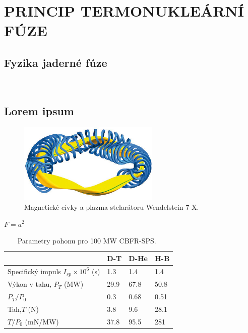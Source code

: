 \documentclass[main.tex]{subfiles}
\begin{document}
\section{PRINCIP TERMONUKLEÁRNÍ FÚZE}
\subsection{Fyzika jaderné fúze}

\lipsum[3]~\cite{hejzlar}

\lipsum[2-4]
\subsection{Lorem ipsum}
\lipsum[1]

\begin{figure}[]
    \centering
    \includegraphics[width=0.6\textwidth]{obrazky/stelarator.jpg}
    \caption{Magnetické cívky a plazma stelarátoru Wendelstein 7-X.\cite{wx-7}}
    \label{fig:wx-7}
\end{figure}
\lipsum[1]
\(F=a^2\)
\begin{table}[]
    \centering
    \caption{Parametry pohonu pro 100 MW CBFR-SPS.~\cite{cheung2004colliding}}
    \begin{tabular}{  p{19em}  p{3em}  p{3em}  p{3em}  }
                                               & D-T  & D-He & H-B \\ \toprule
    Specifický impuls \(I_{sp}\times10^6\) (s) & 1.3  & 1.4  & 1.4 \\
    Výkon v tahu, \(P_T\) (MW)                 & 29.9 & 67.8 & 50.8 \\
    \(P_T/P_0\)                                & 0.3  & 0.68 & 0.51 \\
    Tah,\(T\) (N)                              & 3.8  & 9.6  & 28.1 \\
    \(T/P_0\) (mN/MW)                          & 37.8 & 95.5 & 281 \\ \bottomrule
    \end{tabular}
    \label{tab:cbfrsps}
\end{table}
\FloatBarrier
\end{document}

